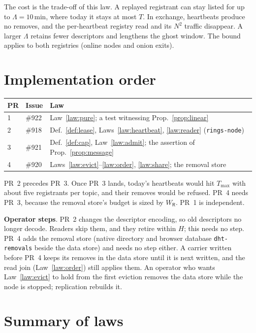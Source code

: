 \documentclass[journal]{IEEEtran}
\newcommand{\Rm}{\mathsf{R}}
\newcommand{\Tmax}{T_{\max}}
\newcommand{\issue}[1]{\#{#1}}
\begin{document}
The cost is the trade-off of this law.  A replayed registrant can stay listed for up to
$\Lambda=10$\,min, where today it stays at most $T$.  In exchange, heartbeats produce no
removes, and the per-heartbeat registry read and its $N^2$ traffic disappear.  A larger
$\Lambda$ retains fewer descriptors and lengthens the ghost window.  The bound applies to
both registries (online nodes and onion exits).

\section{Implementation order}\label{sec:plan}

\begin{center}
\footnotesize
\begin{tabular}{@{}llp{}@{}}
\toprule
PR & Issue & Law\\
\midrule
1 & \issue{922} & Law~\ref{law:pure}; a test witnessing Prop.~\ref{prop:linear}\\
2 & \issue{918} & Def.~\ref{def:lease}, Laws~\ref{law:heartbeat}, \ref{law:reader}
(\texttt{rings-node})\\
3 & \issue{921} & Def.~\ref{def:cap}, Law~\ref{law:admit}; the assertion of
Prop.~\ref{prop:message}\\
4 & \issue{920} & Laws~\ref{law:evict}--\ref{law:order}, \ref{law:share}; the removal
store\\
\bottomrule
\end{tabular}
\end{center}

PR~2 precedes PR~3.  Once PR~3 lands, today's heartbeats would hit $\Tmax$ with about five
registrants per topic, and their removes would be refused.  PR~4 needs PR~3, because the
removal store's budget is sized by $W_\Rm$.  PR~1 is independent.

\textbf{Operator steps}.  PR~2 changes the
descriptor encoding, so old descriptors no longer decode.  Readers skip them, and they
retire within $H$; this needs no step.  PR~4 adds the removal store (native directory and
browser database \texttt{dht-removals} beside the data store) and needs no step either.  A
carrier written before PR~4 keeps its removes in the data store until it is next written,
and the read join (Law~\ref{law:order}) still applies them.  An operator who wants
Law~\ref{law:evict} to hold from the first eviction removes the data store while the node is
stopped; replication rebuilds it.

\section{Summary of laws}
\end{document}
